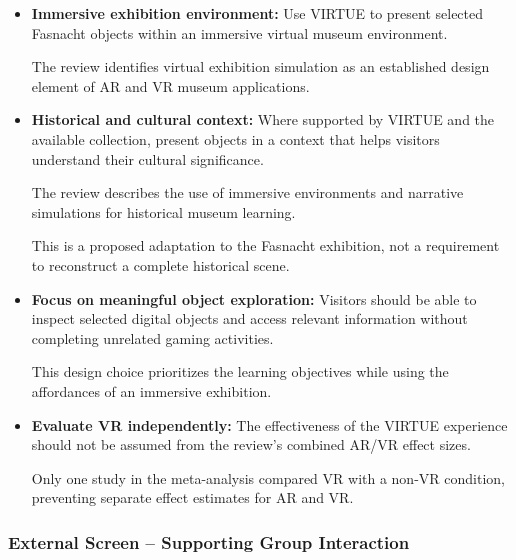 \begin{itemize}
    Visitors should be able to access these explanations
    without being required to read them before exploring.

    This is a proposed application of minimal guidance
    to the virtual exhibition.
    \cite[pp.~727,~733--734]{franse_families_2021}

    \item \textbf{Immersive exhibition environment:}
    Use VIRTUE to present selected Fasnacht objects
    within an immersive virtual museum environment.

    The review identifies virtual exhibition
    simulation as an established design element
    of AR and VR museum applications.
    \cite[pp.~6,~9--10]{zhou_meta-analytic_2022}

    \item \textbf{Historical and cultural context:}
    Where supported by VIRTUE and the available
    collection, present objects in a context
    that helps visitors understand their
    cultural significance.

    The review describes the use of immersive
    environments and narrative simulations
    for historical museum learning.

    This is a proposed adaptation to the
    Fasnacht exhibition, not a requirement
    to reconstruct a complete historical scene.
    \cite[pp.~8--10]{zhou_meta-analytic_2022}

    \item \textbf{Focus on meaningful object exploration:}
    Visitors should be able to inspect selected
    digital objects and access relevant information
    without completing unrelated gaming activities.

    This design choice prioritizes the learning
    objectives while using the affordances of
    an immersive exhibition.
    \cite[pp.~6,~12--13]{zhou_meta-analytic_2022}

    \item \textbf{Evaluate VR independently:}
    The effectiveness of the VIRTUE experience
    should not be assumed from the review's
    combined AR/VR effect sizes.

    Only one study in the meta-analysis
    compared VR with a non-VR condition,
    preventing separate effect estimates
    for AR and VR.
    \cite[p.~10]{zhou_meta-analytic_2022}

\end{itemize}


\subsubsection{External Screen -- Supporting Group Interaction}

